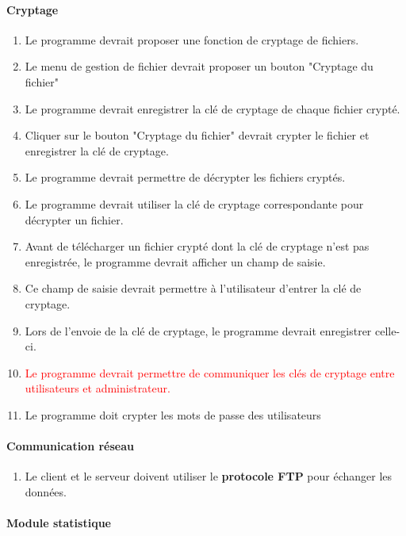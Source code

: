 \documentclass[10pt,a4paper]{report}
\begin{document}
\paragraph{Cryptage}
	\begin{enumerate}
		\item Le programme devrait proposer une fonction de cryptage de fichiers.
		\item Le menu de gestion de fichier devrait proposer un bouton "Cryptage du fichier"
		\item Le programme devrait enregistrer la clé de cryptage de chaque fichier crypté.
		\item Cliquer sur le bouton "Cryptage du fichier" devrait crypter le fichier et enregistrer la clé de cryptage.
		\item Le programme devrait permettre de décrypter les fichiers cryptés.
		\item Le programme devrait utiliser la clé de cryptage correspondante pour décrypter un fichier.
		\item Avant de télécharger un fichier crypté dont la clé de cryptage n'est pas enregistrée, le programme devrait afficher un champ de saisie.
		\item Ce champ de saisie devrait permettre à l'utilisateur d'entrer la clé de cryptage.
		\item Lors de l'envoie de la clé de cryptage, le programme devrait enregistrer celle-ci.
		\item \textcolor{red}{Le programme devrait permettre de communiquer les clés de cryptage entre utilisateurs et administrateur.}
		\item Le programme doit crypter les mots de passe des utilisateurs
	\end{enumerate}
	
\paragraph{Communication réseau}

	\begin{enumerate}
		\item Le client et le serveur doivent utiliser le \textbf{protocole FTP} pour échanger les données.
	\end{enumerate}
	
\paragraph{Module statistique }
\end{document}
